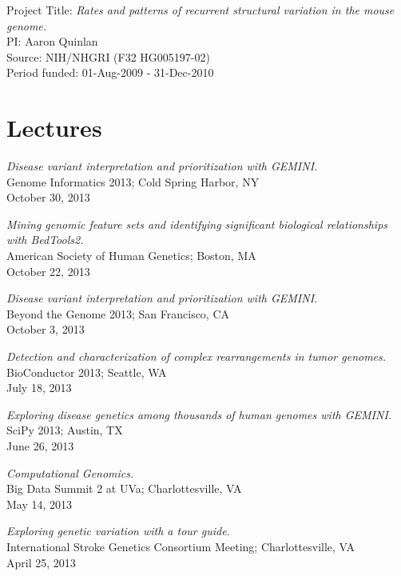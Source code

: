 \documentclass[margin,line]{cv}
\begin{document}
\begin{resume}
    \vspace{-2mm}
    Project Title: \textit{Rates and patterns of recurrent structural variation in the mouse genome.}\\
    PI: Aaron Quinlan\\
    Source: NIH/NHGRI (F32 HG005197-02)\\
    Period funded: 01-Aug-2009 - 31-Dec-2010

    \section{\mysidestyle Lectures}

    \textit{Disease variant interpretation and prioritization with GEMINI.} \\
    Genome Informatics 2013; Cold Spring Harbor, NY \\
    October 30, 2013

    \textit{Mining genomic feature sets and identifying significant biological relationships with BedTools2.} \\
    American Society of Human Genetics; Boston, MA \\
    October 22, 2013

    \textit{Disease variant interpretation and prioritization with GEMINI.} \\
    Beyond the Genome 2013; San Francisco, CA \\
    October 3, 2013

    \textit{Detection and characterization of complex rearrangements in 
	tumor genomes.} \\
    BioConductor 2013; Seattle, WA \\
    July 18, 2013
	
    \textit{Exploring disease genetics among thousands of human genomes 
	with GEMINI.} \\
    SciPy 2013; Austin, TX \\
    June 26, 2013
	
    \textit{Computational Genomics.} \\
    Big Data Summit 2 at UVa; Charlottesville, VA \\
    May 14, 2013
	
    \textit{Exploring genetic variation with a tour guide.} \\
    International Stroke Genetics Consortium Meeting; Charlottesville, VA \\
    April 25, 2013


\end{resume}
\end{document}

